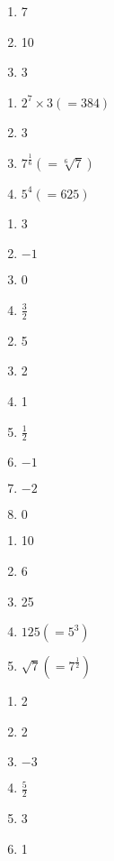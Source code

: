 \documentclass[a4paper]{oblivoir}
\begin{document}
%
\ans
\begin{enumerate}[(1)]
\item
7
\item
10
\item
3
\end{enumerate}

%
\ans
\begin{enumerate}[(1)]
\item
\(2^7\times3(=384)\)
\item
3
\item
\(7^{\frac16}(=\sqrt[6]7)\)
\item
\(5^4(=625)\)
\end{enumerate}

%
\ans
\begin{enumerate}[(1)]
\item
3
\item
\(-1\)
\item
0
\item
\(\frac32\)
\end{enumerate}

%
\ans
\begin{enumerate}[(1)]
\setcounter{enumi}{1}
\item
5
\item
2
\item
1
\item
\(\frac12\)
\item
\(-1\)
\item
\(-2\)
\item
\(0\)
\end{enumerate}

%
\ans
\begin{enumerate}[(1)]
\item
10
\item
6
\item
25
\item
\(125(=5^3)\)
\item
\(\sqrt7(=7^{\frac12})\)
\end{enumerate}

%
\ans
\begin{enumerate}[(1)]
\item
2
\item
2
\item
\(-3\)
\item
\(\frac52\)
\item
3
\item
1
\end{enumerate}
\end{document}
